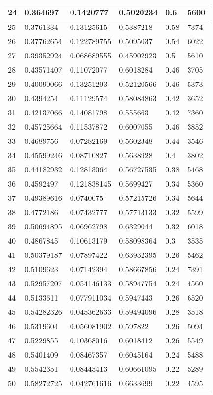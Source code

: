 \begin{longtable}{|l|l|l|l|l|l|}
24 & 0.364697 & 0.1420777 & 0.5020234 & 0.6 & 5600 \\ \hline 
25 & 0.3761334 & 0.13125615 & 0.5387218 & 0.58 & 7374 \\ \hline 
26 & 0.37762654 & 0.122789755 & 0.5095037 & 0.54 & 6022 \\ \hline 
27 & 0.39352924 & 0.068689555 & 0.45902923 & 0.5 & 5610 \\ \hline 
28 & 0.43571407 & 0.11072077 & 0.6018284 & 0.46 & 3705 \\ \hline 
29 & 0.40090066 & 0.13251293 & 0.52120566 & 0.46 & 5373 \\ \hline 
30 & 0.4394254 & 0.11129574 & 0.58084863 & 0.42 & 3652 \\ \hline 
31 & 0.42137066 & 0.14081798 & 0.555663 & 0.42 & 7360 \\ \hline 
32 & 0.45725664 & 0.11537872 & 0.6007055 & 0.46 & 3852 \\ \hline 
33 & 0.4689756 & 0.07282169 & 0.5602348 & 0.44 & 3546 \\ \hline 
34 & 0.45599246 & 0.08710827 & 0.5638928 & 0.4 & 3802 \\ \hline 
35 & 0.44182932 & 0.12813064 & 0.56727535 & 0.38 & 5468 \\ \hline 
36 & 0.4592497 & 0.121838145 & 0.5699427 & 0.34 & 5360 \\ \hline 
37 & 0.49389616 & 0.0740075 & 0.57215726 & 0.34 & 5644 \\ \hline 
38 & 0.4772186 & 0.07432777 & 0.57713133 & 0.32 & 5599 \\ \hline 
39 & 0.50694895 & 0.06962798 & 0.6329044 & 0.32 & 6018 \\ \hline 
40 & 0.4867845 & 0.10613179 & 0.58098364 & 0.3 & 3535 \\ \hline 
41 & 0.50379187 & 0.07897422 & 0.63932395 & 0.26 & 5462 \\ \hline 
42 & 0.5109623 & 0.07142394 & 0.58667856 & 0.24 & 7391 \\ \hline 
43 & 0.52957207 & 0.054146133 & 0.58947754 & 0.24 & 4560 \\ \hline 
44 & 0.5133611 & 0.077911034 & 0.5947443 & 0.26 & 6520 \\ \hline 
45 & 0.54282326 & 0.045362633 & 0.59494096 & 0.28 & 3518 \\ \hline 
46 & 0.5319604 & 0.056081902 & 0.597822 & 0.26 & 5094 \\ \hline 
47 & 0.5229855 & 0.10368016 & 0.6018412 & 0.26 & 5549 \\ \hline 
48 & 0.5401409 & 0.08467357 & 0.6045164 & 0.24 & 5488 \\ \hline 
49 & 0.5542351 & 0.08445413 & 0.60661095 & 0.22 & 5289 \\ \hline 
50 & 0.58272725 & 0.042761616 & 0.6633699 & 0.22 & 4595 \\ \hline 
\end{longtable}